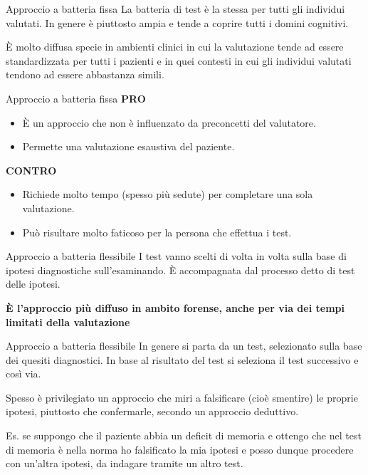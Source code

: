 \documentclass[
  ignorenonframetext,
]{beamer}
\providecommand{\tightlist}{%
  \setlength{\itemsep}{0pt}\setlength{\parskip}{0pt}}
\begin{document}
\begin{frame}{Approccio a batteria fissa}
\label{approccio-a-batteria-fissa}
La batteria di test è la stessa per tutti gli individui valutati. In
genere è piuttosto ampia e tende a coprire tutti i domini cognitivi.

È molto diffusa specie in ambienti clinici in cui la valutazione tende
ad essere standardizzata per tutti i pazienti e in quei contesti in cui
gli individui valutati tendono ad essere abbastanza simili.
\end{frame}

\begin{frame}{Approccio a batteria fissa}
\label{approccio-a-batteria-fissa-1}
\textbf{PRO}

\begin{itemize}
\tightlist
\item
  È un approccio che non è influenzato da preconcetti del valutatore.
\item
  Permette una valutazione esaustiva del paziente.
\end{itemize}

\textbf{CONTRO}

\begin{itemize}
\tightlist
\item
  Richiede molto tempo (spesso più sedute) per completare una sola
  valutazione.
\item
  Può risultare molto faticoso per la persona che effettua i test.
\end{itemize}
\end{frame}

\begin{frame}{Approccio a batteria flessibile}
\label{approccio-a-batteria-flessibile}
I test vanno scelti di volta in volta sulla base di ipotesi diagnostiche
sull'esaminando. È accompagnata dal processo detto di test delle
ipotesi.

\textbf{È l'approccio più diffuso in ambito forense, anche per via dei
tempi limitati della valutazione}
\end{frame}

\begin{frame}{Approccio a batteria flessibile}
\label{approccio-a-batteria-flessibile-1}
In genere si parta da un test, selezionato sulla base dei quesiti
diagnostici. In base al risultato del test si seleziona il test
successivo e così via.

Spesso è privilegiato un approccio che miri a falsificare (cioè
smentire) le proprie ipotesi, piuttosto che confermarle, secondo un
approccio deduttivo.

Es. se suppongo che il paziente abbia un deficit di memoria e ottengo
che nel test di memoria è nella norma ho falsificato la mia ipotesi e
posso dunque procedere con un'altra ipotesi, da indagare tramite un
altro test.
\end{frame}
\end{document}
